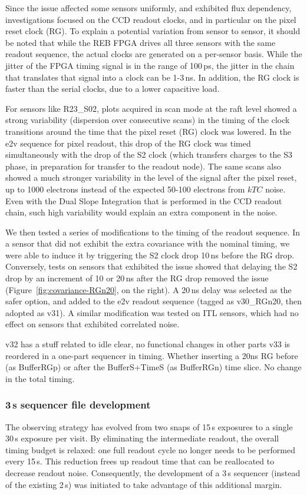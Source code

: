 Since the issue affected some sensors uniformly, and exhibited flux dependency, investigations focused on the CCD readout clocks, and in particular on the pixel reset clock (RG). 
To explain a potential variation from sensor to sensor, it should be noted that while the REB FPGA drives all three sensors with the same readout sequence, the actual clocks are generated on a per-sensor basis. 
While the jitter of the FPGA timing signal is in the range of 100\,ps, the jitter in the chain that translates that signal into a clock can be 1-3\,ns. In addition, the RG clock is faster than the serial clocks, due to a lower capacitive load.

For sensors like R23\_S02, plots acquired in scan mode at the raft level showed a strong variability (dispersion over consecutive scans) in the timing of the clock transitions around the time that the pixel reset (RG) clock was lowered. 
In the e2v sequence for pixel readout, this drop of the RG clock was timed simultaneously with the drop of the S2 clock (which transfers charges to the S3 phase, in preparation for transfer to the readout node). 
The same scans also showed a much stronger variability in the level of the signal after the pixel reset, up to 1000 electrons instead of the expected 50-100 electrons from \(kTC\) noise. Even with the Dual Slope Integration that is performed in the CCD readout chain, such high variability would explain an extra component in the noise.
 
We then tested a series of modifications to the timing of the readout sequence. 
In a sensor that did not exhibit the extra covariance with the nominal timing, we were able to induce it by triggering the S2 clock drop 10\,ns before the RG drop.
Conversely, tests on sensors that exhibited the issue showed that delaying the S2 drop by an increment of 10 or 20\,ns after the RG drop removed the issue (Figure~\ref{fig:covariance-RGn20}, on the right). 
A 20\,ns delay was selected as the safer option, and added to the e2v readout sequence (tagged as v30\_RGn20, then adopted as v31). 
A similar modification was tested on ITL sensors, which had no effect on sensors that exhibited correlated noise.


v32 has a stuff related to idle clear, no functional changes in other parts
v33 is reordered in a one-part sequencer in timing. Whether inserting a 20ns RG before (as BufferRGp) or after the BufferS+TimeS (as BufferRGn) time slice. No change in the total timing.

\subsubsection{3\,s sequencer file development}
The observing strategy has evolved from two snaps of 15\,s exposures to a single 30\,s exposure per visit.  By eliminating the intermediate readout, the overall timing budget is relaxed: one full readout cycle no longer needs to be performed every 15\,s.  
This reduction frees up readout time that can be reallocated to decrease readout noise.  Consequently, the development of a 3\,s sequencer (instead of the existing 2\,s) was initiated to take advantage of this additional margin.

